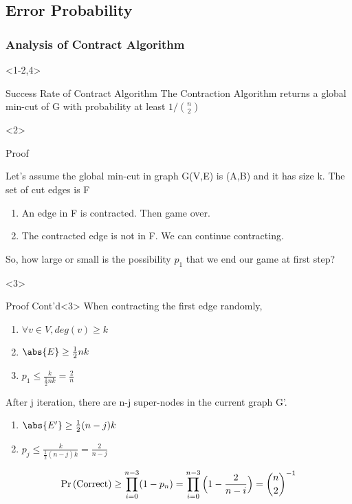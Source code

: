 \documentclass{beamer}
\begin{document}
\subsection{Error Probability}
\begin{frame}

  
\frametitle{Analysis of Contract Algorithm}
\begin{overlayarea}{\linewidth}{\textheight}
	\begin{onlyenv}<1-2,4>
		\begin{block}{Success Rate of Contract Algorithm}
			The Contraction Algorithm returns a global min-cut of G with probability at least $1/\binom n2$	
		\end{block}
	\end{onlyenv}
	
	\begin{onlyenv}
	
		\begin{block}{Proof}
		
		Let's assume the global min-cut in graph G(V,E) is (A,B) and it has size k. The set of cut edges is F
		\begin{enumerate}[{Case}.1]
				\item An edge in F is contracted. Then game over.
				\item The contracted edge is not in F. We can continue contracting.
		\end{enumerate}
		So, how large or small is the possibility $p_1$ that we end our game at first step? \\
		\end{block}
	\end{onlyenv}
	
	\begin{onlyenv}
		\begin{block}{Proof Cont'd}<3>
			When contracting the first edge randomly,
		\begin{enumerate}
			\item $\forall v \in V, deg(v)\geq k$
			\item $\abs{E}\geq \frac{1}{2}nk$
			\item $p_1\leq \frac{k}{\frac{1}{2}nk}=\frac{2}{n}$
		\end{enumerate}
		After j iteration, there are n-j super-nodes in the current graph G'.
		\begin{enumerate}			
			\item $\abs{E'}\geq \frac{1}{2}(n-j)k$
			\item $p_j\leq \frac{k}{\frac{1}{2}(n-j)k}=\frac{2}{n-j}$
		\end{enumerate}
		\begin{equation*}
			\Pr\left(\text{Correct}\right)\geq \prod _{i=0}^{n-3}(1-p_n) = \prod _{i=0}^{n-3}{\Bigl (}1-{\frac {2}{n-i}}{\Bigr )}={\binom n2}^{-1}
		\end{equation*}
		\end{block}
	\end{onlyenv}

\end{overlayarea}
\end{frame}
\end{document}
